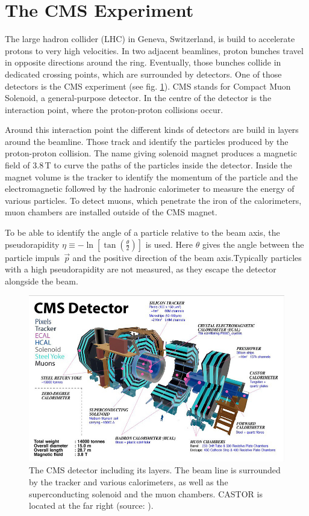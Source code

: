 \section{The CMS Experiment}
The large hadron collider (LHC) in Geneva, Switzerland, is build to accelerate protons to very high velocities. In two adjacent beamlines, proton bunches travel in opposite directions around the ring. Eventually, those bunches collide in dedicated crossing points, which are surrounded by detectors. One of those detectors is the CMS experiment (see fig. \ref{cms}). CMS stands for Compact Muon Solenoid, a general-purpose detector. In the centre of the detector is the interaction point, where the proton-proton collisions occur.

Around this interaction point the different kinds of detectors are build in layers around the beamline. Those track and identify the particles produced by the proton-proton collision. The name giving solenoid magnet produces a magnetic field of 3.8\,T to curve the paths of the particles inside the detector. Inside the magnet volume is the tracker to identify the momentum of the particle and the electromagnetic followed by the hadronic calorimeter to measure the energy of various particles.  To detect muons, which penetrate the iron of the calorimeters, muon chambers are installed outside of the CMS magnet. \cite{CMS}

To be able to identify the angle of a particle relative to the beam axis, the pseudorapidity  ${\eta \equiv - \ln \left[ \tan \left( \frac{\theta}{2} \right) \right]}$ is used. Here $\theta$ gives the angle between the particle \mbox{impuls $\vec{p}$} and the positive direction of the beam axis.Typically particles with a high pseudorapidity are not measured, as they escape the detector alongside the beam. 
\begin{figure}
\centering
\includegraphics[scale=0.4]{cms_with_castor_drawing.jpg}
\caption{The CMS detector including its layers. The beam line is surrounded by the tracker and various calorimeters, as well as the superconducting solenoid and the muon chambers. CASTOR is located at the far right (source: \cite{CMSbild}).}
\label{cms}
\end{figure}

